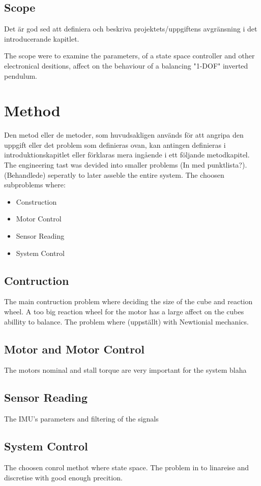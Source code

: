 \documentclass[a4paper,11pt]{kth-mag}
\begin{document}
\section{Scope}
Det är god sed att definiera och beskriva projektets/uppgiftens  avgränsning i det introducerande kapitlet.

The scope were to examine the parameters, of a state space controller and other electronical desitions, affect on the behaviour of a balancing "1-DOF" inverted pendulum.
\chapter{Method}
Den metod eller de metoder, som huvudsakligen används för att angripa den uppgift eller det problem som definieras ovan, kan antingen definieras i introduktionskapitlet eller förklaras mera ingående i ett följande metodkapitel.\\

The engineering tast was devided into smaller problems (In med punktlista?). (Behandlede) seperatly to later asseble the entire system. The choosen subproblems where: 
\begin{itemize}
\item Construction
\item Motor Control
\item Sensor Reading
\item System Control
\end{itemize}

\section{Contruction}
The main contruction problem where deciding the size of the cube and reaction wheel. A too big reaction wheel for the motor has a large affect on the cubes abillity to balance. The problem where (uppställt) with Newtionial mechanics.
 
\section{Motor and Motor Control}
The motors nominal and stall torque are very important for the system blaha
  
\section{Sensor Reading}
The IMU's parameters and filtering of the signals

\section{System Control}
The choosen conrol methot where state space. The problem in to linareise and discretise with good enough precition.
\end{document}
